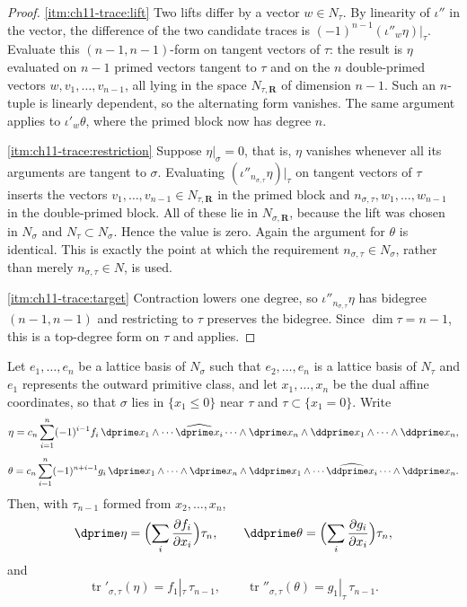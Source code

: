 \begin{proof}
\cref{itm:ch11-trace:lift}
Two lifts differ by a vector $w\in N_\tau$.  By linearity of $\iota''$ in
the vector, the difference of the two candidate traces is
$(-1)^{n-1}(\iota''_w\eta)|_\tau$.  Evaluate this $(n-1,n-1)$-form on
tangent vectors of $\tau$: the result is $\eta$ evaluated on $n-1$ primed
vectors tangent to $\tau$ and on the $n$ double-primed vectors
$w,v_1,\ldots,v_{n-1}$, all lying in the space $N_{\tau,\mathbf R}$ of
dimension $n-1$.  Such an $n$-tuple is linearly dependent, so the
alternating form vanishes.  The same argument applies to
$\iota'_w\theta$, where the primed block now has degree $n$.

\cref{itm:ch11-trace:restriction}
Suppose $\eta|_\sigma=0$, that is, $\eta$ vanishes whenever all its
arguments are tangent to $\sigma$.  Evaluating
$(\iota''_{n_{\sigma,\tau}}\eta)|_\tau$ on tangent vectors of $\tau$
inserts the vectors $v_1,\ldots,v_{n-1}\in N_{\tau,\mathbf R}$ in the primed
block and $n_{\sigma,\tau},w_1,\ldots,w_{n-1}$ in the double-primed block.
All of these lie in $N_{\sigma,\mathbf R}$, because the lift was chosen in
$N_\sigma$ and $N_\tau\subset N_\sigma$.  Hence the value is zero.  Again
the argument for $\theta$ is identical.  This is exactly the point at which
the requirement $n_{\sigma,\tau}\in N_\sigma$, rather than merely
$n_{\sigma,\tau}\in N$, is used.

\cref{itm:ch11-trace:target}
Contraction lowers one degree, so $\iota''_{n_{\sigma,\tau}}\eta$ has
bidegree $(n-1,n-1)$ and restricting to $\tau$ preserves the bidegree.  Since
$\dim\tau=n-1$, this is a top-degree form on $\tau$ and
 applies.
\end{proof}

\begin{lemma}
\label{lem:ch11-trace-normal-form}
Let $e_1,\ldots,e_n$ be a lattice basis of $N_\sigma$ such that
$e_2,\ldots,e_n$ is a lattice basis of $N_\tau$ and $e_1$ represents the
outward primitive class, and let $x_1,\ldots,x_n$ be the dual affine
coordinates, so that $\sigma$ lies in $\{x_1\le0\}$ near $\tau$ and
$\tau\subset\{x_1=0\}$.  Write
\[
 \eta=c_n\sum_{i=1}^n(-1)^{i-1}f_i\,
   \dprime x_1\wedge\cdots\widehat{\dprime x_i}\cdots\wedge\dprime x_n
   \wedge\ddprime x_1\wedge\cdots\wedge\ddprime x_n ,
\]
\[
 \theta=c_n\sum_{i=1}^n(-1)^{n+i-1}g_i\,
   \dprime x_1\wedge\cdots\wedge\dprime x_n
   \wedge\ddprime x_1\wedge\cdots\widehat{\ddprime x_i}
        \cdots\wedge\ddprime x_n .
\]
Then, with $\tau_{n-1}$ formed from $x_2,\ldots,x_n$,
\[
 \dprime\eta=\Bigl(\sum_i\frac{\partial f_i}{\partial x_i}\Bigr)\tau_n,
 \qquad
 \ddprime\theta=\Bigl(\sum_i\frac{\partial g_i}{\partial x_i}\Bigr)\tau_n,
\]
and
\[
 \operatorname{tr}'_{\sigma,\tau}(\eta)=f_1|_\tau\,\tau_{n-1},
 \qquad
 \operatorname{tr}''_{\sigma,\tau}(\theta)=g_1|_\tau\,\tau_{n-1}.
\]
\end{lemma}

